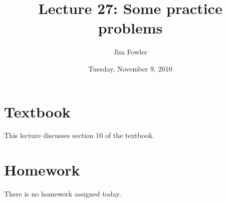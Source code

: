 \documentclass[12pt]{handout}
\title{Lecture 27: Some practice problems}
\author{Jim Fowler}
\date{Tuesday, November  9, 2010}
\begin{document}
\maketitle

\section*{Textbook}

This lecture discusses section 10 of the textbook.

\section*{Homework} 

There is no homework assigned today.
\end{document}
